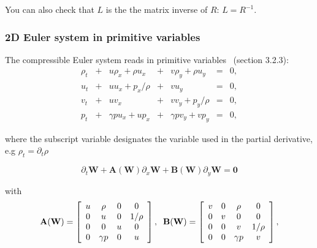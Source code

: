 \documentclass{article}
\begin{document}
You can also check that $L$ is the the matrix inverse of $R$: $L = R^{-1}$.

\subsubsection*{2D Euler system in primitive variables}
The compressible Euler system reads in primitive variables~\cite{toro} (section 3.2.3):\\

\begin{equation}
  \begin{array}{ccccccc}
    \rho_t & + & u\rho_x+\rho u_x & + & v\rho_y+\rho u_y & = &0,\\
    u_t    & + & u u_x + p_x/\rho & + & v u_y            & = &0,\\
    v_t    & + & u v_x            & + & v v_y + p_y/\rho & = &0,\\
    p_t    & + & \gamma p u_x + u p_x & + & \gamma p v_y + v p_y & = &0,
  \end{array}
\end{equation}

where the subscript variable designates the variable used in the partial derivative, e.g $\rho_t = \partial_t \rho$

\begin{equation}
  \partial_t \mathbf{W} + \mathbf{A(W)} \partial_x \mathbf{W} + \mathbf{B(W)} \partial_y \mathbf{W} = \mathbf{0}
\end{equation}

with
\begin{equation}
  \mathbf{A(W)} = \left[
    \begin{array}{c c c c}
      u & \rho     & 0 & 0 \\
      0 & u        & 0 & 1/\rho\\
      0 & 0        & u & 0 \\
      0 & \gamma p & 0 & u \\
    \end{array}
  \right],
  \;\;
  \mathbf{B(W)} = \left[
    \begin{array}{c c c c}
      v & 0 & \rho     & 0 \\
      0 & v & 0        & 0\\
      0 & 0 & v        & 1/\rho \\
      0 & 0 & \gamma p & v \\
    \end{array}
  \right],
\end{equation}
\end{document}
